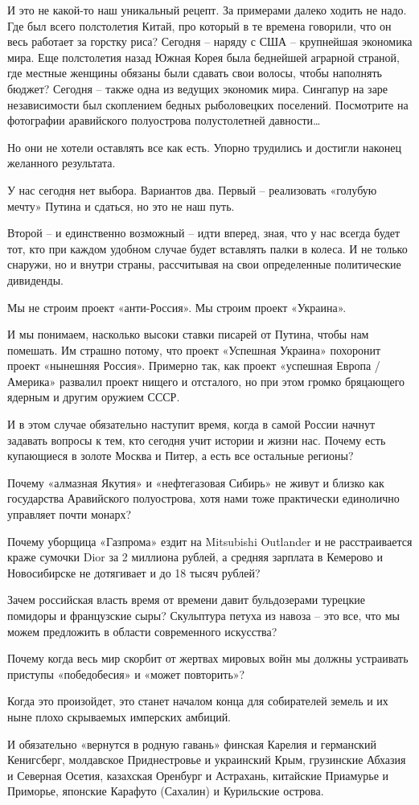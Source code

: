 И это не какой-то наш уникальный рецепт. За примерами далеко ходить не надо.
Где был всего полстолетия Китай, про который в те времена говорили, что он весь
работает за горстку риса? Сегодня – наряду с США – крупнейшая экономика мира.
Еще полстолетия назад Южная Корея была беднейшей аграрной страной, где местные
женщины обязаны были сдавать свои волосы, чтобы наполнять бюджет? Сегодня –
также одна из ведущих экономик мира. Сингапур на заре независимости был
скоплением бедных рыболовецких поселений. Посмотрите на фотографии аравийского
полуострова полустолетней давности…

Но они не хотели оставлять все как есть. Упорно трудились и достигли наконец
желанного результата.

У нас сегодня нет выбора. Вариантов два. Первый – реализовать «голубую мечту»
Путина и сдаться, но это не наш путь. 

Второй – и единственно возможный – идти вперед, зная, что у нас всегда будет
тот, кто при каждом удобном случае будет вставлять палки в колеса. И не только
снаружи, но и внутри страны, рассчитывая на свои определенные политические
дивиденды.

Мы не строим проект «анти-Россия». Мы строим проект «Украина».

И мы понимаем, насколько высоки ставки писарей от Путина, чтобы нам помешать.
Им страшно потому, что проект «Успешная Украина» похоронит проект «нынешняя
Россия». Примерно так, как проект «успешная Европа / Америка» развалил проект
нищего и отсталого, но при этом громко бряцающего ядерным и другим оружием
СССР.

И в этом случае обязательно наступит время, когда в самой России начнут
задавать вопросы к тем, кто сегодня учит истории и жизни нас. Почему есть
купающиеся в золоте Москва и Питер, а есть все остальные регионы? 

Почему «алмазная Якутия» и «нефтегазовая Сибирь» не живут и близко как
государства Аравийского полуострова, хотя нами тоже практически единолично
управляет почти монарх? 

Почему уборщица «Газпрома» ездит на Mitsubishi Outlander и не расстраивается
краже сумочки Dior за 2 миллиона рублей, а средняя зарплата в Кемерово и
Новосибирске не дотягивает и до 18 тысяч рублей? 

Зачем российская власть время от времени давит бульдозерами турецкие помидоры и
французские сыры? Скульптура петуха из навоза – это все, что мы можем
предложить в области современного искусства? 

Почему когда весь мир скорбит от жертвах мировых войн мы должны устраивать
приступы «победобесия» и «может повторить»?

Когда это произойдет, это станет началом конца для собирателей земель и их ныне
плохо скрываемых имперских амбиций. 

И обязательно «вернутся в родную гавань» финская Карелия и германский
Кенигсберг, молдавское Приднестровье и украинский Крым, грузинские Абхазия и
Северная Осетия, казахская Оренбург и Астрахань, китайские Приамурье и
Приморье, японские Карафуто (Сахалин) и Курильские острова.

